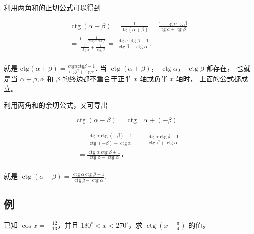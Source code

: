 利用两角和的正切公式可以得到

\[
\begin{array}{l} \operatorname{ctg} (\alpha + \beta) = \frac {1}{\operatorname{tg} (\alpha + \beta)} = \frac {1 - \operatorname{tg} \alpha \operatorname{tg} \beta}{\operatorname{tg} \alpha + \operatorname{tg} \beta} \\ = \frac {1 - \frac {1}{\operatorname{ctg} \alpha \operatorname{ctg} \beta}}{\frac {1}{\operatorname{ctg} \alpha} + \frac {1}{\operatorname{ctg} \beta}} = \frac {\operatorname{ctg} \alpha \operatorname{ctg} \beta - 1}{\operatorname{ctg} \beta + \operatorname{ctg} \alpha}. \\ \end{array}
\]

就是
\(\boxed{\mathrm{ctg}(\alpha + \beta) = \frac{\mathrm{ctg}\alpha\mathrm{ctg}\beta - 1}{\mathrm{ctg}\beta + \mathrm{ctg}\alpha}}.\)
当 \(\operatorname{ctg}(\alpha + \beta)\)，
\(\operatorname{ctg} \alpha\)， \(\operatorname{ctg} \beta\) 都存在，
也就是当 \(\alpha + \beta, \alpha\) 和 \(\beta\) 的终边都不重合于正半
\(x\) 轴或负半 \(x\) 轴时， 上面的公式都成立。

利用两角和的余切公式，又可导出

\[
\operatorname{ctg} (\alpha - \beta) = \operatorname{ctg} [ \alpha + (- \beta) ]
\]

\[
\begin{array}{l} = \frac {\operatorname{ctg} \alpha \operatorname{ctg} (- \beta) - 1}{\operatorname{ctg} (- \beta) + \operatorname{ctg} \alpha} = \frac {- \operatorname{ctg} \alpha \operatorname{ctg} \beta - 1}{- \operatorname{ctg} \beta + \operatorname{ctg} \alpha} \\ = \frac {\operatorname{ctg} \alpha \operatorname{ctg} \beta + 1}{\operatorname{ctg} \beta - \operatorname{ctg} \alpha}\text{，} \\ \end{array}
\]

就是
\(\boxed{\operatorname{ctg}(\alpha - \beta) = \frac{\operatorname{ctg}\alpha\operatorname{ctg}\beta + 1}{\operatorname{ctg}\beta - \operatorname{ctg}\alpha}}.\)

\subsection{例}

已知 \(\cos x = -\frac{12}{13}\)，并且
\(180^{\circ} < x < 270^{\circ}\)，求
\(\operatorname{ctg}\left(x - \frac{\pi}{4}\right)\) 的值。

